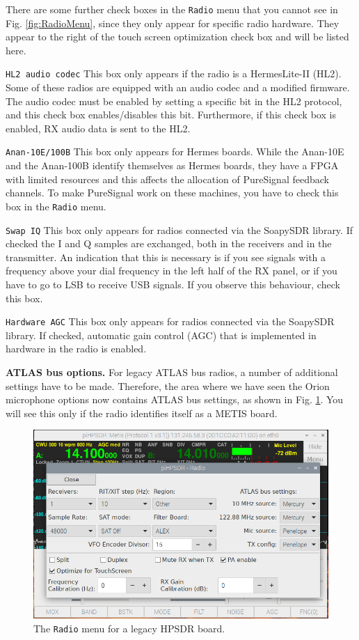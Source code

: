 \documentclass[12pt]{book}
\def\rett#1{\texttt{\color{red}#1}}
\def\bltt#1{\texttt{\color{blue}#1}}
\begin{document}
 There are some further check boxes in the \bltt{Radio} menu that you cannot see
 in Fig. \ref{fig:RadioMenu}, since they only appear for specific radio hardware.
 They appear to the right of the touch screen optimization check box
 and will be listed here.

 \rett{HL2 audio codec} This box only appears if the radio is a HermesLite-II (HL2). Some
 of these radios are equipped with an audio codec and a modified firmware. The
 audio codec must be enabled by setting a specific bit in the HL2 protocol,
 and this check box enables/disables this bit. Furthermore, if this check box
 is enabled, RX audio data is sent to the HL2.

 \rett{Anan-10E/100B} This box only appears for Hermes boards. While the Anan-10E and
 the Anan-100B identify themselves as Hermes boards, they have a FPGA with limited
 resources and this affects the allocation of PureSignal feedback channels. To make
 PureSignal work on these machines, you have to check this box in the \bltt{Radio} menu.

 \rett{Swap IQ} This box only appears for radios connected via the SoapySDR library. If checked
 the I and Q samples are exchanged, both in the receivers and in the transmitter. An indication
 that this is necessary is if you see signals with a frequency above your dial frequency in
 the left half of the RX panel, or if you have to go to LSB to receive USB signals. If you
 observe this behaviour, check this box.

 \rett{Hardware AGC} This box only appears for radios connected via the SoapySDR library.
 If checked, automatic gain control (AGC) that is implemented in hardware in the radio is enabled.

 \textbf{ATLAS bus options.} For legacy ATLAS bus radios, a number of additional settings have to be
 made. Therefore, the area where we have seen the Orion microphone options now contains ATLAS bus
 settings, as shown in Fig. \ref{fig:RadioMenuMetis}. You will see this only if the radio identifies
 itself as a METIS board.

\begin{figure}[ht]
\center
\includegraphics[width=12cm]{RadioMenuMetis.png}
\caption{The \bltt{Radio} menu for a legacy HPSDR board.}
\label{fig:RadioMenuMetis}
\end{figure}
\end{document}
